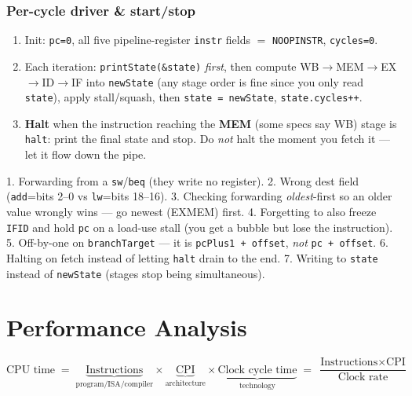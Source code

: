 \documentclass[10pt]{article}
\newcommand{\code}[1]{\texttt{\small #1}}
\begin{document}
\subsubsection{Per-cycle driver \& start/stop}
\begin{enumerate}
\item Init: \code{pc=0}, all five pipeline-register \code{instr} fields $=$ \code{NOOPINSTR}, \code{cycles=0}.
\item Each iteration: \code{printState(\&state)} \emph{first}, then compute WB$\to$MEM$\to$EX$\to$ID$\to$IF
into \code{newState} (any stage order is fine since you only read \code{state}), apply stall/squash, then \code{state = newState}, \code{state.cycles++}.
\item \textbf{Halt} when the instruction reaching the \textbf{MEM} (some specs say WB) stage is
\code{halt}: print the final state and stop. Do \emph{not} halt the moment you fetch it --- let it flow down the pipe.
\end{enumerate}

\begin{pitbox}
1. Forwarding from a \code{sw}/\code{beq} (they write no register). 2. Wrong dest field
(\code{add}=bits 2--0 vs \code{lw}=bits 18--16). 3. Checking forwarding \emph{oldest}-first so an
older value wrongly wins --- go newest (EXMEM) first. 4. Forgetting to also freeze \code{IFID} and
hold \code{pc} on a load-use stall (you get a bubble but lose the instruction). 5. Off-by-one on
\code{branchTarget} --- it is \code{pcPlus1 + offset}, \emph{not} \code{pc + offset}. 6. Halting on
fetch instead of letting \code{halt} drain to the end. 7. Writing to \code{state} instead of
\code{newState} (stages stop being simultaneous).
\end{pitbox}

\section{Performance Analysis}

\begin{formbox}
\[
\text{CPU time} \;=\; \underbrace{\text{Instructions}}_{\text{program/ISA/compiler}}
\times \underbrace{\text{CPI}}_{\text{architecture}}
\times \underbrace{\text{Clock cycle time}}_{\text{technology}}
\;=\; \frac{\text{Instructions}\times\text{CPI}}{\text{Clock rate}}
\]
\end{formbox}
\end{document}
